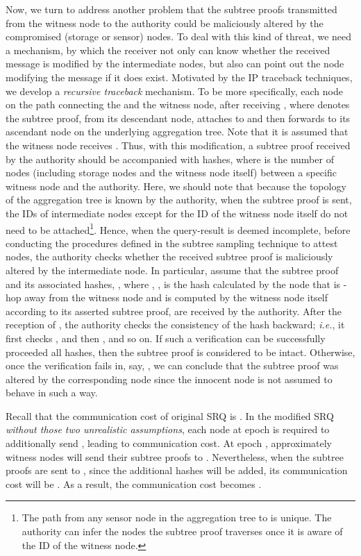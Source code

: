 \documentclass[conference]{IEEEtran}
\begin{document}
Now, we turn to address another problem that the subtree proofs transmitted from the witness node to the authority could be maliciously altered by the compromised (storage or sensor) nodes. To deal with this kind of threat, we need a mechanism, by which the receiver not only can know whether the received message is modified by the intermediate nodes, but also can point out the node modifying the message if it does exist. Motivated by the IP traceback techniques, we develop a \emph{recursive traceback} mechanism. To be more specifically, each node  on the path connecting the  and the witness node, after receiving , where  denotes the subtree proof, from its descendant node, attaches  to  and then forwards  to its ascendant node on the underlying aggregation tree. Note that it is assumed that the witness node receives . Thus, with this modification, a subtree proof received by the authority should be accompanied with  hashes, where  is the number of nodes (including storage nodes and the witness node itself) between a specific witness node and the authority. Here, we should note that because the topology of the aggregation tree is known by the authority, when the subtree proof is sent, the IDs of intermediate nodes except for the ID of the witness node itself do not need to be attached\footnote{The path from any sensor node in the aggregation tree to  is unique. The authority can infer the nodes the subtree proof traverses once it is aware of the ID of the witness node.}. Hence, when the query-result is deemed incomplete, before conducting the procedures defined in the subtree sampling technique to attest nodes, the authority checks whether the received subtree proof is maliciously altered by the intermediate node. In particular, assume that the subtree proof and its  associated hashes, , where , , is the hash calculated by the node that is -hop away from the witness node and  is computed by the witness node itself according to its asserted subtree proof, are received by the authority. After the reception of , the authority checks the consistency of the hash backward; \emph{i.e.}, it first checks , and then , and so on. If such a verification can be successfully proceeded all  hashes, then the subtree proof  is considered to be intact. Otherwise, once the verification fails in, say, , we can conclude that the subtree proof was altered by the corresponding node since the innocent node is not assumed to behave in such a way.

Recall that the communication cost of original SRQ is . In the modified SRQ \emph{without those two unrealistic assumptions}, each node  at epoch  is required to additionally send , leading to  communication cost. At epoch , approximately  witness nodes will send their subtree proofs to . Nevertheless, when the subtree proofs are sent to , since the additional hashes will be added, its communication cost will be . As a result, the communication cost becomes .
\end{document}
